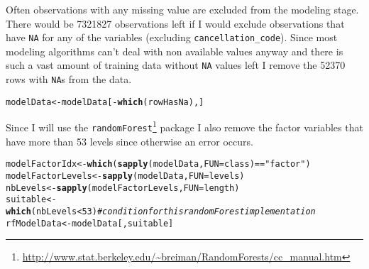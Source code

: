 \documentclass{article}\usepackage[]{graphicx}\usepackage[]{color}
\makeatletter
\newcommand{\hlnum}[1]{\textcolor[rgb]{0.686,0.059,0.569}{#1}}%
\newcommand{\hlstr}[1]{\textcolor[rgb]{0.192,0.494,0.8}{#1}}%
\newcommand{\hlcom}[1]{\textcolor[rgb]{0.678,0.584,0.686}{\textit{#1}}}%
\newcommand{\hlopt}[1]{\textcolor[rgb]{0,0,0}{#1}}%
\newcommand{\hlstd}[1]{\textcolor[rgb]{0.345,0.345,0.345}{#1}}%
\newcommand{\hlkwb}[1]{\textcolor[rgb]{0.69,0.353,0.396}{#1}}%
\newcommand{\hlkwc}[1]{\textcolor[rgb]{0.333,0.667,0.333}{#1}}%
\newcommand{\hlkwd}[1]{\textcolor[rgb]{0.737,0.353,0.396}{\textbf{#1}}}%
\newenvironment{kframe}{%
 \def\at@end@of@kframe{}%
 \ifinner\ifhmode%
  \def\at@end@of@kframe{\end{minipage}}%
  \begin{minipage}{\columnwidth}%
 \fi\fi%
 \def\FrameCommand##1{\hskip\@totalleftmargin \hskip-\fboxsep
 \colorbox{shadecolor}{##1}\hskip-\fboxsep
     \hskip-\linewidth \hskip-\@totalleftmargin \hskip\columnwidth}%
 \MakeFramed {\advance\hsize-\width
   \@totalleftmargin\z@ \linewidth\hsize
   \@setminipage}}%
 {\par\unskip\endMakeFramed%
 \at@end@of@kframe}
\newenvironment{knitrout}{}{} %
\makeatother
\begin{document}
Often observations with any missing value are excluded from the modeling stage. 
There would be 7321827 observations left if I would exclude observations that have \verb+NA+ for any of the variables (excluding \verb+cancellation_code+).
Since most modeling algorithms can't deal with non available values anyway and there is such a vast amount of training data without \verb+NA+ values left I remove the 52370 rows with \verb+NA+s from the data.

\begin{knitrout}
\color{fgcolor}\begin{kframe}
\begin{alltt}
\hlstd{modelData} \hlkwb{<-} \hlstd{modelData[}\hlopt{-}\hlkwd{which}\hlstd{(rowHasNa),]}
\end{alltt}
\end{kframe}
\end{knitrout}

Since I will use the \verb+randomForest+\footnote{\url{http://www.stat.berkeley.edu/~breiman/RandomForests/cc_manual.htm}} package I also remove the factor variables that have more than 53 levels since otherwise an error occurs.
\begin{knitrout}
\color{fgcolor}\begin{kframe}
\begin{alltt}
\hlstd{modelFactorIdx} \hlkwb{<-} \hlkwd{which}\hlstd{(}\hlkwd{sapply}\hlstd{(modelData,} \hlkwc{FUN}\hlstd{=class)} \hlopt{==} \hlstr{"factor"}\hlstd{)}
\hlstd{modelFactorLevels} \hlkwb{<-} \hlkwd{sapply}\hlstd{(modelData,} \hlkwc{FUN}\hlstd{=levels)}
\hlstd{nbLevels} \hlkwb{<-} \hlkwd{sapply}\hlstd{(modelFactorLevels,} \hlkwc{FUN}\hlstd{=length)}
\hlstd{suitable} \hlkwb{<-} \hlkwd{which}\hlstd{(nbLevels} \hlopt{<} \hlnum{53}\hlstd{)} \hlcom{# condition for this randomForest implementation}
\hlstd{rfModelData} \hlkwb{<-} \hlstd{modelData[,suitable]}
\end{alltt}
\end{kframe}
\end{knitrout}
\end{document}
